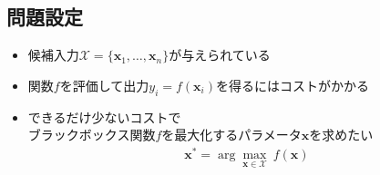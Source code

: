 \documentclass[dvipdfmx, 10.5pt]{beamer}
\begin{document}



\subsection{問題設定}
\begin{frame}{\insertsubsection}
	\begin{itemize}
		\vspace{20pt}
		\item 候補入力$\mathcal{X} = \{ \bm x_1, \ldots, \bm x_n \}$が与えられている
		\vspace{9pt}
		\item 関数$f$を評価して出力$y_i = f(\bm x_i)$を得るにはコストがかかる
		\vspace{9pt}
		\item \textcolor{myorange}{できるだけ少ないコスト}で\\
  \vspace{2pt}\textcolor{myorange}{ブラックボックス関数$f$を最大化するパラメータ$\bm x$}を求めたい
		\begin{align*}
			\bm x^* = \arg \max_{\bm x \in \mathcal{X}} ~ f(\bm x)
		\end{align*}
	\end{itemize}
\end{frame}

\end{document}
